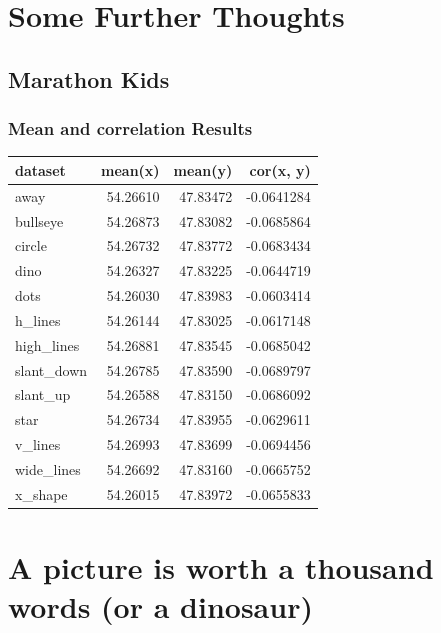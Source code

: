 \documentclass[
]{book}
\begin{document}
\hypertarget{some-further-thoughts}{%
\chapter{Some Further Thoughts}\label{some-further-thoughts}}

\hypertarget{marathon-kids-1}{%
\section{Marathon Kids}\label{marathon-kids-1}}

\hypertarget{mean-and-correlation-results}{%
\subsection{Mean and correlation Results}\label{mean-and-correlation-results}}

\begin{tabular}{l|r|r|r}
\hline
dataset & mean(x) & mean(y) & cor(x, y)\\
\hline
away & 54.26610 & 47.83472 & -0.0641284\\
\hline
bullseye & 54.26873 & 47.83082 & -0.0685864\\
\hline
circle & 54.26732 & 47.83772 & -0.0683434\\
\hline
dino & 54.26327 & 47.83225 & -0.0644719\\
\hline
dots & 54.26030 & 47.83983 & -0.0603414\\
\hline
h\_lines & 54.26144 & 47.83025 & -0.0617148\\
\hline
high\_lines & 54.26881 & 47.83545 & -0.0685042\\
\hline
slant\_down & 54.26785 & 47.83590 & -0.0689797\\
\hline
slant\_up & 54.26588 & 47.83150 & -0.0686092\\
\hline
star & 54.26734 & 47.83955 & -0.0629611\\
\hline
v\_lines & 54.26993 & 47.83699 & -0.0694456\\
\hline
wide\_lines & 54.26692 & 47.83160 & -0.0665752\\
\hline
x\_shape & 54.26015 & 47.83972 & -0.0655833\\
\hline
\end{tabular}

\hypertarget{a-picture-is-worth-a-thousand-words-or-a-dinosaur}{%
\chapter{\texorpdfstring{A picture is worth a thousand words (\textbf{or a dinosaur})}{A picture is worth a thousand words (or a dinosaur)}}\label{a-picture-is-worth-a-thousand-words-or-a-dinosaur}}
\end{document}
